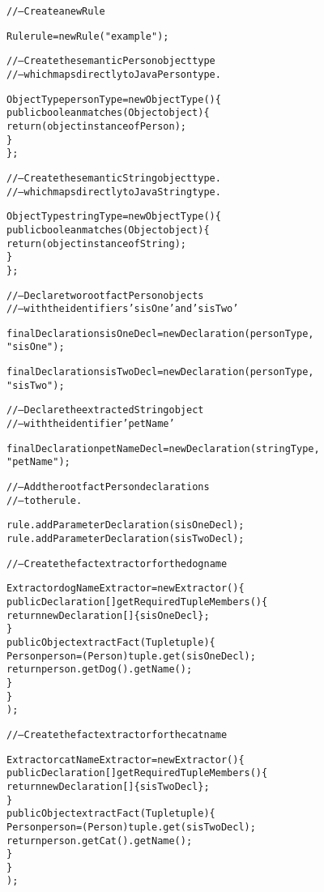 \footnotesize
\begin{alltt}
// -- Create a new Rule

Rule rule = new Rule("example");

// -- Create the semantic Person object type
// -- which maps directly to Java Person type.

ObjectType personType = new ObjectType() \{
        public boolean matches(Object object) \{ 
            return ( object instanceof Person );
        \}
    \};

// -- Create the semantic String object type.
// -- which maps directly to Java String type.

ObjectType stringType = new ObjectType() \{
        public boolean matches(Object object) \{ 
            return ( object instanceof String );
        \}
    \};

// -- Declare two root fact Person objects 
// -- with the identifiers 'sisOne' and 'sisTwo'

final Declaration sisOneDecl = new Declaration( personType,
                                                "sisOne" );

final Declaration sisTwoDecl = new Declaration( personType,
                                                "sisTwo" );

// -- Declare the extracted String object
// -- with the identifier 'petName'

final Declaration petNameDecl = new Declaration( stringType,
                                                 "petName" );

// -- Add the root fact Person declarations
// -- to the rule.

rule.addParameterDeclaration( sisOneDecl );
rule.addParameterDeclaration( sisTwoDecl );

\newpage

// -- Create the fact extractor for the dog name

Extractor dogNameExtractor = new Extractor() \{
        public Declaration[] getRequiredTupleMembers() \{
            return new Declaration[] \{ sisOneDecl \};
        \}
        public Object extractFact(Tuple tuple) \{
            Person person = (Person) tuple.get( sisOneDecl );
            return person.getDog().getName();
        \}
    \}
      );

// -- Create the fact extractor for the cat name

Extractor catNameExtractor = new Extractor() \{
        public Declaration[] getRequiredTupleMembers() \{
            return new Declaration[] \{ sisTwoDecl \};
        \}
        public Object extractFact(Tuple tuple) \{
            Person person = (Person) tuple.get( sisTwoDecl );
            return person.getCat().getName();
        \}
    \}
      );


\end{alltt}
